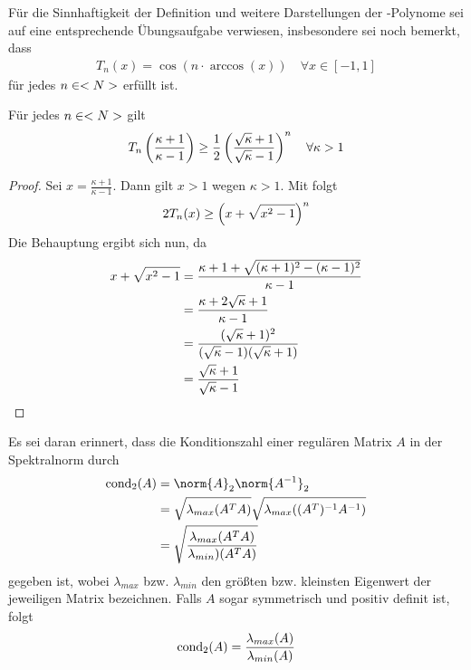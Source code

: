 Für die Sinnhaftigkeit der Definition und weitere Darstellungen der -Polynome sei auf eine entsprechende Übungsaufgabe verwiesen, insbesondere sei noch bemerkt, dass
\begin{align}
	\label{2_30}
	T_n(x)=\cos(n\cdot \arccos(x))\quad\forall x\in[-1,1]
\end{align}
für jedes $n\in<N>$ erfüllt ist.

\begin{lemma}
	Für jedes $n\in<N>$ gilt
	\begin{align}
		T_n\left(\frac{\kappa +1}{\kappa -1}\right) \ge \frac{1}{2}\left(\frac{\sqrt{\kappa}+1}{\sqrt{\kappa}-1}\right)^n\quad\forall\kappa >1\notag
	\end{align}
\end{lemma}
\begin{proof}
	Sei $x=\frac{\kappa +1}{\kappa -1}$. Dann gilt $x>1$ wegen $\kappa >1$. Mit  folgt
	\begin{align}
		2T_n(x)\ge \left(x+\sqrt{x^2-1}\right)^n\notag
	\end{align}
	Die Behauptung ergibt sich nun, da
	\begin{align}
		x+\sqrt{x^2-1} &= \frac{\kappa +1+\sqrt{(\kappa +1)^2-(\kappa -1)^2}}{\kappa-1} \notag \\
		&= \frac{\kappa+2\sqrt{\kappa}+1}{\kappa-1} \notag \\
		&= \frac{(\sqrt{\kappa}+1)^2}{(\sqrt{\kappa}-1)(\sqrt{\kappa}+1)} \notag \\
		&= \frac{\sqrt{\kappa}+1}{\sqrt{\kappa}-1} \notag
	\end{align}
\end{proof}

Es sei daran erinnert, dass die Konditionszahl einer regulären Matrix $A$ in der Spektralnorm durch 
\begin{align}
	\cond_2(A) &= \norm{A}_2\norm{A^{-1}}_2 \notag \\
	&= \sqrt{\lambda_{max}(A^TA)}\sqrt{\lambda_{max}((A^T)^{-1}A^{-1})} \notag \\
	&= \sqrt{\frac{\lambda_{max}(A^TA)}{\lambda_{min})(A^TA)}} \notag 
\end{align}
gegeben ist, wobei $\lambda_{max}$ bzw. $\lambda_{min}$ den größten bzw. kleinsten Eigenwert der jeweiligen Matrix bezeichnen. Falls $A$ sogar symmetrisch und positiv definit ist, folgt
\begin{align}
	\operatorname{cond}_2(A) = \frac{\lambda_{max}(A)}{\lambda_{min}(A)}\notag
\end{align}

